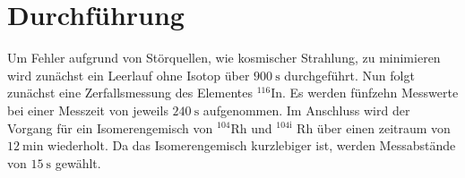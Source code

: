 
\section{Durchführung}
\label{sec:Durchführung}
Um Fehler aufgrund von Störquellen, wie kosmischer Strahlung, zu minimieren wird zunächst ein Leerlauf ohne Isotop über $\SI{900}{\second}$ durchgeführt. Nun folgt zunächst eine Zerfallsmessung des Elementes $^{116}$In. Es werden fünfzehn Messwerte bei
 einer Messzeit von jeweils $\SI{240}{\second}$ aufgenommen. Im Anschluss wird der Vorgang für ein Isomerengemisch von $^{104}$Rh und $^{104\text{i}}$ Rh über einen zeitraum von $\SI{12}{\minute}$ wiederholt. Da das Isomerengemisch kurzlebiger ist, werden Messabstände von $\SI{15}{\second}$ gewählt.
